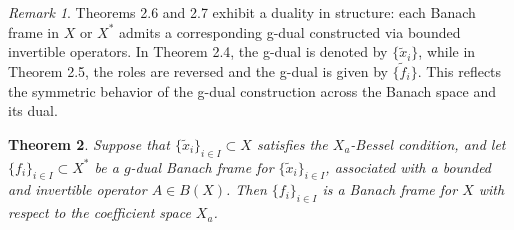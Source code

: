 \documentclass[12pt]{article}
\newtheorem{theorem}{Theorem}[section]
\theoremstyle{definition}
\theoremstyle{remark}
\newtheorem{remark}[theorem]{Remark}
\begin{document}
\begin{remark}
Theorems 2.6 and 2.7 exhibit a duality in structure: each Banach frame in \( X \) or \( X^* \) admits a corresponding g-dual constructed via bounded invertible operators. In Theorem 2.4, the g-dual is denoted by \( \{\tilde{x}_i\} \), while in Theorem 2.5, the roles are reversed and the g-dual is given by \( \{\tilde{f}_i\} \). This reflects the symmetric behavior of the g-dual construction across the Banach space and its dual.
\end{remark}

\begin{theorem}
Suppose that \(\{\tilde{x}_i\}_{i\in I}\subset X\) satisfies the
\(X_a\)-Bessel condition, and let \(\{f_i\}_{i\in I}\subset X^*\) be a
\(g\)-dual Banach frame for \(\{\tilde{x}_i\}_{i\in I}\), associated with
a bounded and invertible operator \(A\in B(X)\). Then
\(\{f_i\}_{i\in I}\) is a Banach frame for \(X\) with respect to the
coefficient space \(X_a\).

\end{theorem}
\end{document}
